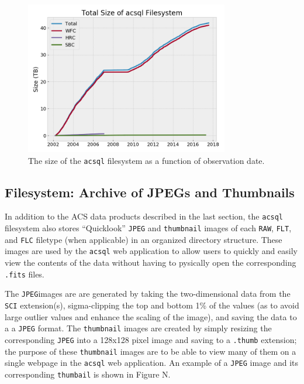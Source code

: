 \documentclass[10pt,journal,compsoc]{IEEEtran}
\begin{document}
\begin{figure}[!t]
\centering
\includegraphics[width=3.5in]{./figures/filesystem_size.png}
\caption{The size of the \texttt{acsql} filesystem as a function of observation
date.}
\label{fig1}
\end{figure}


\subsection{Filesystem: Archive of JPEGs and Thumbnails}

In addition to the ACS data products described in the last section, the
\texttt{acsql} filesystem also stores ``Quicklook'' \texttt{JPEG} and
\texttt{thumbnail} images of each \texttt{RAW}, \texttt{FLT}, and \texttt{FLC}
filetype (when applicable) in an organized directory structure.  These
images are used by the \texttt{acsql} web application to allow users to
quickly and easily view the contents of the data without having to
pysically open the corresponding \texttt{.fits} files.

The \texttt{JPEG}images are are generated by taking the two-dimensional
data from the \texttt{SCI} extension(s), sigma-clipping the top and bottom
1\% of the values (as to avoid large outlier values and enhance the scaling
of the image), and saving the data to a a \texttt{JPEG} format.  The
\texttt{thumbnail} images are created by simply resizing the corresponding
\texttt{JPEG} into a 128x128 pixel image and saving to a \texttt{.thumb}
extension; the purpose of these \texttt{thumbnail} images are to be able
to view many of them on a single webpage in the \texttt{acsql} web
application.  An example of a \texttt{JPEG} image and its corresponding
\texttt{thumbail} is shown in Figure N.
\end{document}
